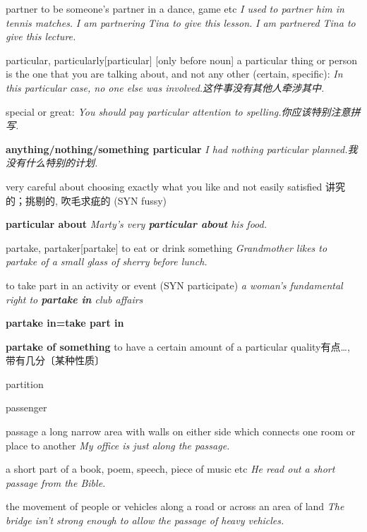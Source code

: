 \begin{DefWord}{partner}
    to be someone's partner in a dance, game etc
    \textit{I used to partner him in tennis matches.}
    \textit{I am partnering Tina to give this lesson.}
    \textit{I am partnered Tina to give this lecture.}
\end{DefWord}

\begin{DefWord}{particular, particularly}[particular]
    [only before noun] a particular thing or person is the one that you are talking about, and not any other (certain, specific):
    \textit{In this particular case, no one else was involved.这件事没有其他人牵涉其中. }

    special or great:
    \textit{You should pay particular attention to spelling.你应该特别注意拼写. }
    
    \textbf{anything/nothing/something particular}
    \textit{I had nothing particular planned.我没有什么特别的计划. }

    very careful about choosing exactly what you like and not easily satisfied 讲究的；挑剔的, 吹毛求疵的 (SYN  fussy)
    
    \textbf{particular about}
    \textit{Marty's very \textbf{particular about} his food.}

\end{DefWord}

\begin{DefWord}{partake, partaker}[partake]
    to eat or drink something
    \textit{Grandmother likes to partake of a small glass of sherry before lunch.}

    to take part in an activity or event
    (SYN  participate)
    \textit{a woman's fundamental right to \textbf{partake in} club affairs}

    \textbf{partake in=take part in}

    \textbf{partake of something} 
    to have a certain amount of a particular quality有点…, 带有几分〔某种性质〕
\end{DefWord}

\begin{DefWord}{partition}
\end{DefWord}

\begin{DefWord}{passenger}
\end{DefWord}

\begin{DefWord}{passage}
    a long narrow area with walls on either side which connects one room or place to another
    \textit{My office is just along the passage.}

    a short part of a book, poem, speech, piece of music etc
    \textit{He read out a short passage from the Bible.}

    the movement of people or vehicles along a road or across an area of land
    \textit{The bridge isn't strong enough to allow the passage of heavy vehicles.}
\end{DefWord}

